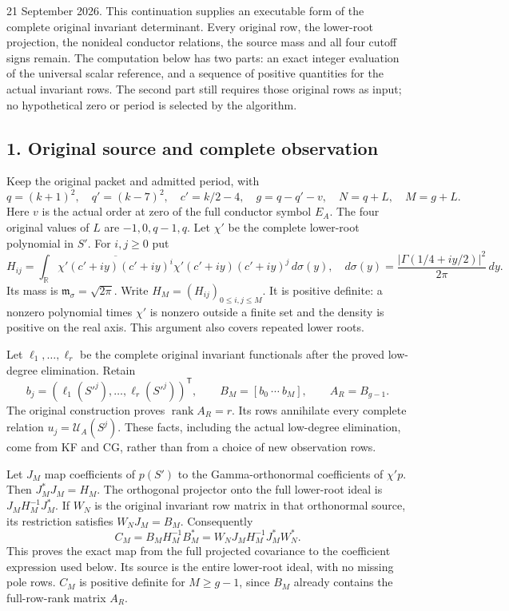 \documentclass[11pt]{article}
\begin{document}
21 September 2026. This continuation supplies an executable form of the complete original invariant determinant. Every original row, the lower-root projection, the nonideal conductor relations, the source mass and all four cutoff signs remain. The computation below has two parts: an exact integer evaluation of the universal scalar reference, and a sequence of positive quantities for the actual invariant rows. The second part still requires those original rows as input; no hypothetical zero or period is selected by the algorithm.

\subsection{1. Original source and complete observation}\label{original-source-and-complete-observation}

Keep the original packet and admitted period, with \[
q=(k+1)^2,\quad q'=(k-7)^2,\quad c'=k/2-4,\quad
g=q-q'-v,\quad N=q+L,\quad M=g+L.
\tag{CI1}
\] Here \(v\) is the actual order at zero of the full conductor symbol \(E_A\). The four original values of \(L\) are \(-1,0,q-1,q\). Let \(\chi'\) be the complete lower-root polynomial in \(S'\). For \(i,j\ge0\) put \[
H_{ij}=\int_{\mathbb R}\overline{\chi'(c'+iy)(c'+iy)^i}
\chi'(c'+iy)(c'+iy)^j\,d\sigma(y),\quad
d\sigma(y)=\frac{|\Gamma(1/4+iy/2)|^2}{2\pi}\,dy.
\tag{CI2}
\] Its mass is \(\mathfrak m_\sigma=\sqrt{2\pi}\). Write \(H_M=(H_{ij})_{0\le i,j\le M}\). It is positive definite: a nonzero polynomial times \(\chi'\) is nonzero outside a finite set and the density is positive on the real axis. This argument also covers repeated lower roots.

Let \(\ell_1,\ldots,\ell_r\) be the complete original invariant functionals after the proved low-degree elimination. Retain \[
b_j=(\ell_1(S'^j),\ldots,\ell_r(S'^j))^{\mathsf T},\qquad
B_M=[b_0\ \cdots\ b_M],\qquad A_R=B_{g-1}.
\tag{CI3}
\] The original construction proves \(\operatorname{rank}A_R=r\). Its rows annihilate every complete relation \(u_j=\mathcal U_A(S^j)\). These facts, including the actual low-degree elimination, come from KF and CG, rather than from a choice of new observation rows.

Let \(J_M\) map coefficients of \(p(S')\) to the Gamma-orthonormal coefficients of \(\chi'p\). Then \(J_M^*J_M=H_M\). The orthogonal projector onto the full lower-root ideal is \(J_MH_M^{-1}J_M^*\). If \(W_N\) is the original invariant row matrix in that orthonormal source, its restriction satisfies \(W_NJ_M=B_M\). Consequently \[
C_M=B_MH_M^{-1}B_M^*
=W_NJ_MH_M^{-1}J_M^*W_N^*.
\tag{CI4}
\] This proves the exact map from the full projected covariance to the coefficient expression used below. Its source is the entire lower-root ideal, with no missing pole rows. \(C_M\) is positive definite for \(M\ge g-1\), since \(B_M\) already contains the full-row-rank matrix \(A_R\).
\end{document}
